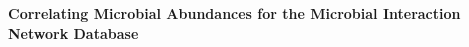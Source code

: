 
\begin{titlepage}

  \newcommand{\HRule}{\rule{\linewidth}{0.5mm}} %

  \center %





  \vspace*{\fill}
  { \huge \bfseries Correlating Microbial Abundances for the Microbial Interaction Network Database}\\[0.4cm] %






  \vspace*{\fill} %

\end{titlepage}


\newpage
